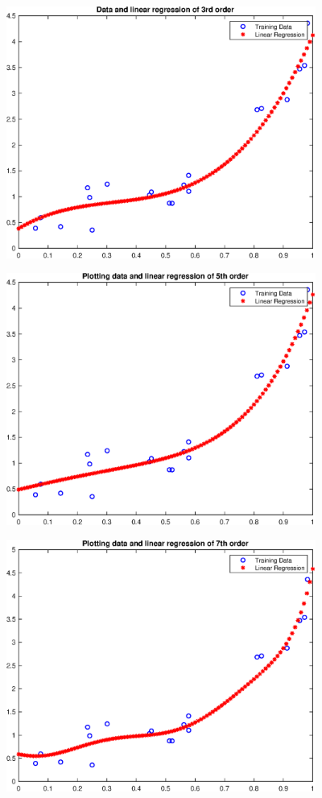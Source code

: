 \documentclass{article}
\begin{document}
\includegraphics [width=4in]{practice1_03.eps}

\includegraphics [width=4in]{practice1_04.eps}

\includegraphics [width=4in]{practice1_05.eps}
\end{document}
